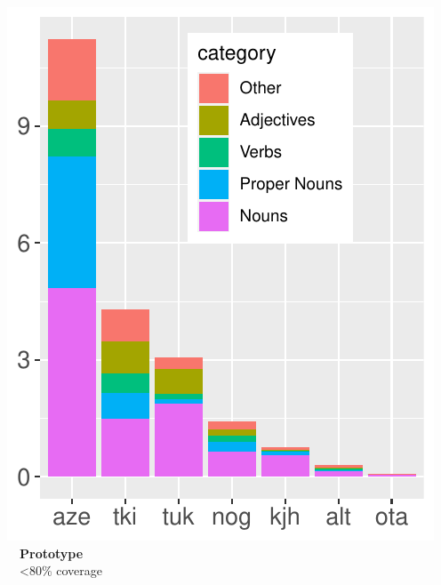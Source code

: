 \documentclass[a0paper,fleqn]{betterposter}
\begin{document}
{\begin{minipage}{0.317\textwidth}
    \includegraphics[width=\textwidth]{img/lgs3}\vspace{-0.8em}\\
    {\color{lightred}~~\textbf{Prototype}}\\
    ~~<80\% coverage
\end{minipage}

\vfill


}
\end{document}

